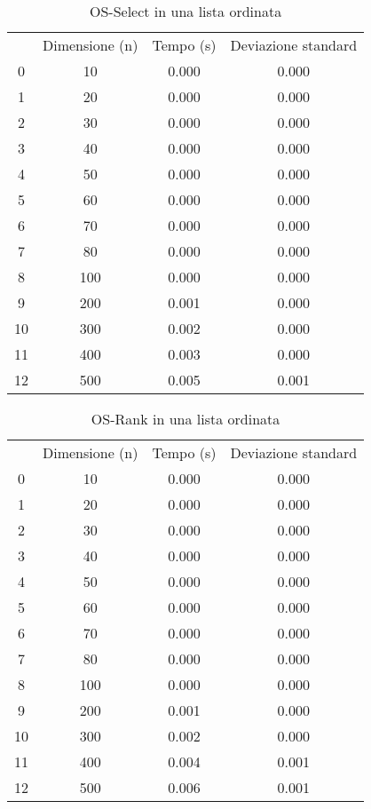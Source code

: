 \begin{table}[H]
\centering
\caption{OS-Select in una lista ordinata}
\label{OS-Select in una lista ordinata}
\begin{tabular}{cccc}
 & Dimensione (n) & Tempo (s) & Deviazione standard \\
0 & 10 & 0.000 & 0.000 \\
\cline{1-4}
1 & 20 & 0.000 & 0.000 \\
\cline{1-4}
2 & 30 & 0.000 & 0.000 \\
\cline{1-4}
3 & 40 & 0.000 & 0.000 \\
\cline{1-4}
4 & 50 & 0.000 & 0.000 \\
\cline{1-4}
5 & 60 & 0.000 & 0.000 \\
\cline{1-4}
6 & 70 & 0.000 & 0.000 \\
\cline{1-4}
7 & 80 & 0.000 & 0.000 \\
\cline{1-4}
8 & 100 & 0.000 & 0.000 \\
\cline{1-4}
9 & 200 & 0.001 & 0.000 \\
\cline{1-4}
10 & 300 & 0.002 & 0.000 \\
\cline{1-4}
11 & 400 & 0.003 & 0.000 \\
\cline{1-4}
12 & 500 & 0.005 & 0.001 \\
\cline{1-4}
\end{tabular}
\end{table}

\begin{table}[H]
\centering
\caption{OS-Rank in una lista ordinata}
\label{OS-Rank in una lista ordinata}
\begin{tabular}{cccc}
 & Dimensione (n) & Tempo (s) & Deviazione standard \\
0 & 10 & 0.000 & 0.000 \\
\cline{1-4}
1 & 20 & 0.000 & 0.000 \\
\cline{1-4}
2 & 30 & 0.000 & 0.000 \\
\cline{1-4}
3 & 40 & 0.000 & 0.000 \\
\cline{1-4}
4 & 50 & 0.000 & 0.000 \\
\cline{1-4}
5 & 60 & 0.000 & 0.000 \\
\cline{1-4}
6 & 70 & 0.000 & 0.000 \\
\cline{1-4}
7 & 80 & 0.000 & 0.000 \\
\cline{1-4}
8 & 100 & 0.000 & 0.000 \\
\cline{1-4}
9 & 200 & 0.001 & 0.000 \\
\cline{1-4}
10 & 300 & 0.002 & 0.000 \\
\cline{1-4}
11 & 400 & 0.004 & 0.001 \\
\cline{1-4}
12 & 500 & 0.006 & 0.001 \\
\cline{1-4}
\end{tabular}
\end{table}
